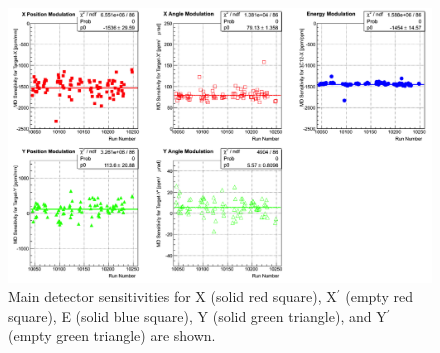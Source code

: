 \begin{singlespace}
\begin{figure}[!h]
	\begin{center}
	\includegraphics[width=15.0cm]{figures/BModSensitivities}
	\end{center}
	\caption
	{Main detector sensitivities for X (solid red square), X$^\prime$ (empty red square), E (solid blue square), Y (solid green triangle), and Y$^\prime$ (empty green triangle) are shown. }
	\label{fig:BModSensitivities}
\end{figure}
\end{singlespace}


